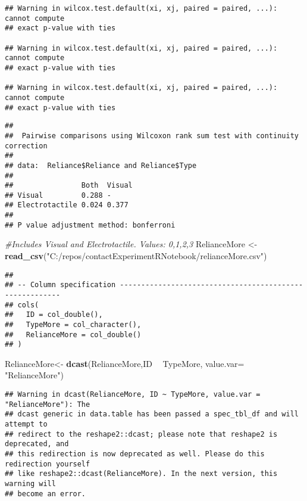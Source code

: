 \documentclass[
]{article}
\newenvironment{Shaded}{\begin{snugshade}}{\end{snugshade}}
\newcommand{\CommentTok}[1]{\textcolor[rgb]{0.56,0.35,0.01}{\textit{#1}}}
\newcommand{\DataTypeTok}[1]{\textcolor[rgb]{0.13,0.29,0.53}{#1}}
\newcommand{\KeywordTok}[1]{\textcolor[rgb]{0.13,0.29,0.53}{\textbf{#1}}}
\newcommand{\NormalTok}[1]{#1}
\newcommand{\OperatorTok}[1]{\textcolor[rgb]{0.81,0.36,0.00}{\textbf{#1}}}
\newcommand{\StringTok}[1]{\textcolor[rgb]{0.31,0.60,0.02}{#1}}
\begin{document}
\begin{verbatim}
## Warning in wilcox.test.default(xi, xj, paired = paired, ...): cannot compute
## exact p-value with ties

## Warning in wilcox.test.default(xi, xj, paired = paired, ...): cannot compute
## exact p-value with ties

## Warning in wilcox.test.default(xi, xj, paired = paired, ...): cannot compute
## exact p-value with ties
\end{verbatim}

\begin{verbatim}
## 
##  Pairwise comparisons using Wilcoxon rank sum test with continuity correction 
## 
## data:  Reliance$Reliance and Reliance$Type 
## 
##                Both  Visual
## Visual         0.288 -     
## Electrotactile 0.024 0.377 
## 
## P value adjustment method: bonferroni
\end{verbatim}

\begin{Shaded}
\begin{Highlighting}[]
\CommentTok{#Includes Visual and Electrotactile. Values: 0,1,2,3}
\NormalTok{RelianceMore <-}\StringTok{ }\KeywordTok{read_csv}\NormalTok{(}\StringTok{"C:/repos/contactExperimentRNotebook/relianceMore.csv"}\NormalTok{)}
\end{Highlighting}
\end{Shaded}

\begin{verbatim}
## 
## -- Column specification --------------------------------------------------------
## cols(
##   ID = col_double(),
##   TypeMore = col_character(),
##   RelianceMore = col_double()
## )
\end{verbatim}

\begin{Shaded}
\begin{Highlighting}[]
\NormalTok{RelianceMore<-}\StringTok{ }\KeywordTok{dcast}\NormalTok{(RelianceMore,ID }\OperatorTok{~}\StringTok{ }\NormalTok{TypeMore, }\DataTypeTok{value.var=} \StringTok{"RelianceMore"}\NormalTok{)}
\end{Highlighting}
\end{Shaded}

\begin{verbatim}
## Warning in dcast(RelianceMore, ID ~ TypeMore, value.var = "RelianceMore"): The
## dcast generic in data.table has been passed a spec_tbl_df and will attempt to
## redirect to the reshape2::dcast; please note that reshape2 is deprecated, and
## this redirection is now deprecated as well. Please do this redirection yourself
## like reshape2::dcast(RelianceMore). In the next version, this warning will
## become an error.
\end{verbatim}
\end{document}

